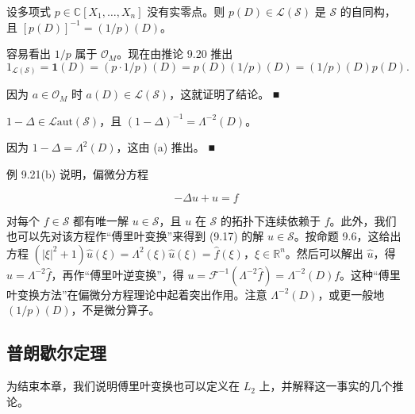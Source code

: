 \begin{example}

\begin{items}
\item

设多项式 $ p \in \mathbb{C}[X_1,\ldots,X_n] $ 没有实零点。则 $ p(D) \in \mathcal{L}(\mathcal{S}) $ 是 $ \mathcal{S} $ 的自同构，且 $ [p(D)]^{-1} = (1/p)(D) $。

\proofhead
容易看出 $ 1/p $ 属于 $ \mathcal{O}_M $。现在由推论 9.20 推出
\[
1_{\mathcal{L}(\mathcal{S})} = \mathbf{1}(D) = (p \cdot 1/p)(D) = p(D)(1/p)(D) = (1/p)(D)p(D) .
\]

因为 $ a \in \mathcal{O}_M $ 时 $ a(D) \in \mathcal{L}(\mathcal{S}) $，这就证明了结论。 \nobreak\hspace{0.35em}■

\item

$ 1 - \Delta \in \mathcal{L}\mathrm{aut}(\mathcal{S}) $，且 $ (1 - \Delta)^{-1} = \Lambda^{-2}(D) $。

\proofhead
因为 $ 1 - \Delta = \Lambda^2(D) $，这由 (a) 推出。 \nobreak\hspace{0.35em}■
\end{items}

例 9.21(b) 说明，偏微分方程

\begin{equation}
-\Delta u + u = f\tag{9.17}
\end{equation}

对每个 $ f \in \mathcal{S} $ 都有唯一解 $ u \in \mathcal{S} $，且 $ u $ 在 $ \mathcal{S} $ 的拓扑下连续依赖于 $ f $。此外，我们也可以先对该方程作“傅里叶变换”来得到 (9.17) 的解 $ u \in \mathcal{S} $。按命题 9.6，这给出方程 $ (|\xi|^2 + 1)\hat{u}(\xi) = \Lambda^2(\xi)\hat{u}(\xi) = \hat{f}(\xi) $，$ \xi \in \mathbb{R}^n $。然后可以解出 $ \hat{u} $，得 $ \hat{u} = \Lambda^{-2}\hat{f} $，再作“傅里叶逆变换”，得 $ u = \mathcal{F}^{-1}(\Lambda^{-2}\hat{f}) = \Lambda^{-2}(D)f $。这种“傅里叶变换方法”在偏微分方程理论中起着突出作用。注意 $ \Lambda^{-2}(D) $，或更一般地 $ (1/p)(D) $，不是微分算子。

\end{example}

\subsection*{普朗歇尔定理}

为结束本章，我们说明傅里叶变换也可以定义在 $ L_2 $ 上，并解释这一事实的几个推论。


